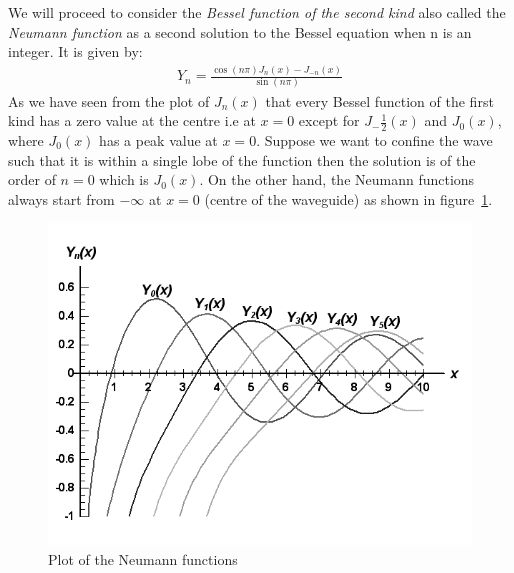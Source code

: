 We will proceed to consider the \emph{Bessel function of the second kind} also called the \emph{Neumann function} as a second solution to the Bessel equation when n is an integer. It is given by: 
\begin{align}
Y_n = \frac{\cos(n\pi) J_n(x) - J_{-n}(x)}{\sin(n\pi)}
\label{eqn:neumannfunctions}
\end{align}
As we have seen from the plot of $J_n(x)$ that every Bessel function of the first kind has a zero value at the centre i.e at $x= 0$ except for $J_-{\frac{1}{2}}(x)$ and $J_0(x)$, where $J_0(x)$ has a peak value at $ x= 0$. Suppose we want to confine the wave such that it is within a single lobe of the function then the solution is of the order of $n =0$ which is $J_0(x)$. On the other hand, the Neumann functions always start from $-\infty$ at $x=0$ (centre of the waveguide) as shown in figure~\ref{fig:fig-3}.
\begin{figure}[h]
\centering
\includegraphics[width=1\linewidth]{./graphics/BesselY_800}
\caption{ Plot of the Neumann functions}
\label{fig:fig-3}
\end{figure}

